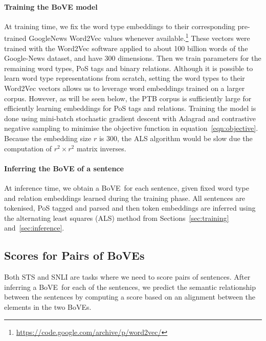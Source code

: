 \documentclass[11pt,a4paper]{article}
\newcommand{\by}{{\times}}
\newcommand{\bove}{Bo{\nolinebreak\hspace{-0.25ex}}VE}
\newcommand{\boves}{Bo{\nolinebreak\hspace{-0.25ex}}VEs}
\begin{document}
\paragraph{Training the {\bove} model}
%
At training time, we fix the word type embeddings to their corresponding
pre-trained GoogleNews Word2Vec values whenever
available.\footnote{\url{https://code.google.com/archive/p/word2vec/}} These
vectors were trained with the Word2Vec software \cite{word2vec2_nips} applied
to about 100 billion words of the Google-News dataset, and have 300
dimensions.  Then we train parameters for the remaining word types, PoS
tags and binary relations. Although it is possible to learn word type
representations from scratch, setting the word types to their Word2Vec
vectors allows us to leverage word embeddings trained on a larger
corpus. However, as will be seen below, the PTB corpus is sufficiently
large for efficiently learning embeddings for PoS tags and relations. Training
the model is done using mini-batch stochastic gradient descent with Adagrad \cite{adagrad2011}
and contrastive negative sampling to minimise the objective
function in equation~\ref{eqn:objective}.
Because the embedding size $r$ is 300, the ALS algorithm would be slow due the
computation of $r^2\by r^2$ matrix inverses.


\paragraph{Inferring the {\bove} of a sentence }
%
At inference time, we obtain a \bove\ for each
sentence, given fixed word type and relation embeddings learned during the
training phase. All sentences are tokenised, PoS tagged and parsed 
and then token embeddings are inferred using the alternating
least squares (ALS) method from Sections~\ref{sec:training} and~\ref{sec:inference}.


\subsection{Scores for Pairs of \boves}

Both STS and SNLI are tasks where we need to score pairs of sentences.  After
inferring a \bove\ for each of the sentences, we predict the semantic
relationship between the sentences by computing a score based on an alignment
between the elements in the two {\bove}s.  
\end{document}
